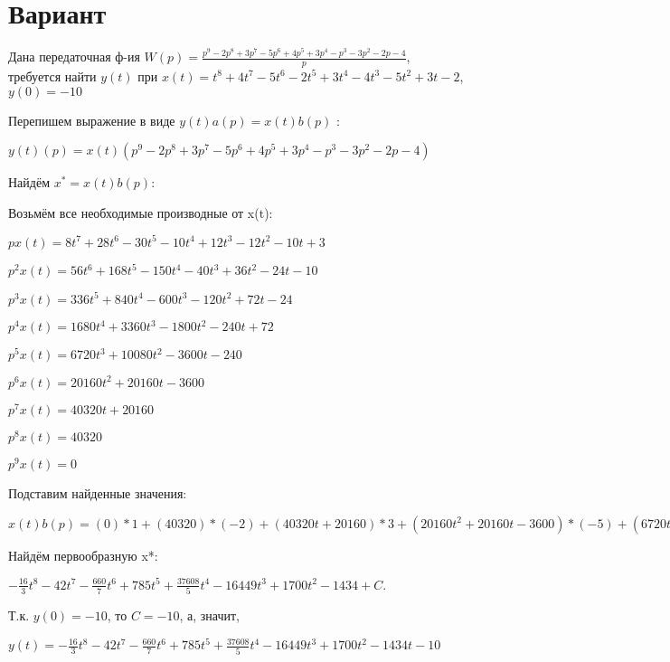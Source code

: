 \documentclass{article}
\begin{document}
\section{Вариант}

Дана передаточная ф-ия $W(p)=\frac{p^{9}-2p^{8}+3p^{7}-5p^{6}+4p^{5}+3p^{4}-p^{3}-3p^{2}-2p-4}{p}$, требуется найти $y(t)$ при $x(t)=t^{8}+4t^{7}-5t^{6}-2t^{5}+3t^{4}-4t^{3}-5t^{2}+3t-2$, $y(0)=-10$

Перепишем выражение в виде $y(t)a(p)=x(t)b(p)$ :

$y(t)(p)=x(t)(p^{9}-2p^{8}+3p^{7}-5p^{6}+4p^{5}+3p^{4}-p^{3}-3p^{2}-2p-4)$

Найдём $x^*=x(t)b(p)$:

Возьмём все необходимые производные от x(t):

$px(t)=8t^{7}+28t^{6}-30t^{5}-10t^{4}+12t^{3}-12t^{2}-10t+3$

$p^2x(t)=56t^{6}+168t^{5}-150t^{4}-40t^{3}+36t^{2}-24t-10$

$p^3x(t)=336t^{5}+840t^{4}-600t^{3}-120t^{2}+72t-24$

$p^4x(t)=1680t^{4}+3360t^{3}-1800t^{2}-240t+72$

$p^5x(t)=6720t^{3}+10080t^{2}-3600t-240$

$p^6x(t)=20160t^{2}+20160t-3600$

$p^7x(t)=40320t+20160$

$p^8x(t)=40320$

$p^9x(t)=0$

Подставим найденные значения:

$x(t)b(p) = (0)*1+(40320)*(-2)+(40320t+20160)*3+(20160t^{2}+20160t-3600)*(-5)+(6720t^{3}+10080t^{2}-3600t-240)*4+(1680t^{4}+3360t^{3}-1800t^{2}-240t+72)*3+(336t^{5}+840t^{4}-600t^{3}-120t^{2}+72t-24)*(-1)+(56t^{6}+168t^{5}-150t^{4}-40t^{3}+36t^{2}-24t-10)*(-3)+(8t^{7}+28t^{6}-30t^{5}-10t^{4}+12t^{3}-12t^{2}-10t+3)*(-2)+(8t^{7}+28t^{6}-30t^{5}-10t^{4}+12t^{3}-12t^{2}-10t+3)*(-4)=-48t^{7}-336t^{6}-660t^{5}+4710t^{4}+37608t^{3}-65796t^{2}+5100t$





Найдём первообразную x*:

$-\frac{16}{3}t^{8}-42t^{7}-\frac{660}{7}t^{6}+785t^{5}+\frac{37608}{5}t^{4}-16449t^{3}+1700t^{2}-1434+C.$

Т.к. $y(0)=-10$, то $C=-10$, а, значит, 

$y(t)=-\frac{16}{3}t^{8}-42t^{7}-\frac{660}{7}t^{6}+785t^{5}+\frac{37608}{5}t^{4}-16449t^{3}+1700t^{2}-1434t-10$
\end{document}
